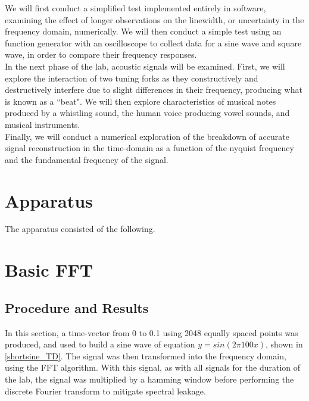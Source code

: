 \documentclass[aps,prl,reprint]{revtex4-2}
\begin{document}
We will first conduct a simplified test implemented entirely in software,
examining the effect of longer observations on the linewidth, or uncertainty
in the frequency domain, numerically. We will then conduct a simple test
using an function generator with an oscilloscope to collect data for a 
sine wave and square wave, in order to compare their frequency responses. \\

In the next phase of the lab, acoustic signals will be examined. 
First, we will explore the interaction of two tuning forks as they 
constructively and destructively interfere due to slight differences 
in their frequency, producing what is known as a ``beat". We will then
explore characteristics of musical notes produced by a whistling sound, 
the human voice producing vowel sounds, and musical instruments. \\

Finally, we will conduct a numerical exploration of the breakdown of accurate
signal reconstruction in the time-domain as a function of the nyquist
frequency and the fundamental frequency of the signal. 

\section{Apparatus}

The apparatus consisted of the following.
\begin{itemize}
\end{itemize}

\section{Basic FFT}

\subsection{Procedure and Results}

In this section, a time-vector from 0 to 0.1 using 2048 equally spaced points
was produced, and used to build a sine wave of equation $y=sin(2\pi 100 x)$, 
shown in \ref{shortsine_TD}.
The signal was then transformed into the frequency domain, using the 
FFT algorithm. With this signal, as with all signals for the duration of the
lab, the signal was multiplied by a hamming window before performing the
discrete Fourier transform to mitigate spectral leakage. \\
\end{document}
